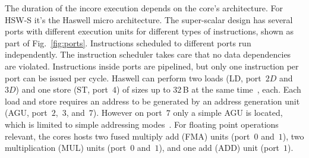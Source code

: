 {The duration of the incore execution depends on the core's architecture.
For HSW-S it's the Haswell micro architecture.
The super-scalar design has several ports with different execution units for
different types of instructions, shown as part of Fig.~\ref{fig:ports}.
Instructions scheduled to different ports run independently.
The instruction scheduler takes care that no data dependencies are violated.
Instructions inside ports are pipelined, but only one instruction per port can
be issued per cycle.
Haswell can perform two loads (LD, port~$2D$ and~$3D$) and one store (ST,
port~$4$) of sizes up to $32$\,B at the same time~\cite{intel-orm-2016}, each.
Each load and store requires an address to be generated by an address
generation unit (AGU, port~$2$,~$3$, and~$7$).
However on port~$7$ only a simple AGU is located, which is limited to simple
addressing modes~\cite{intel-orm-2016,hofmann-2016-hsw}.
%
For floating point operations relevant, the cores hosts two fused multiply add
(FMA) units (port~$0$ and~$1$), two multiplication (MUL) units (port~$0$
and~$1$), and one add (ADD) unit (port~$1$).

}
